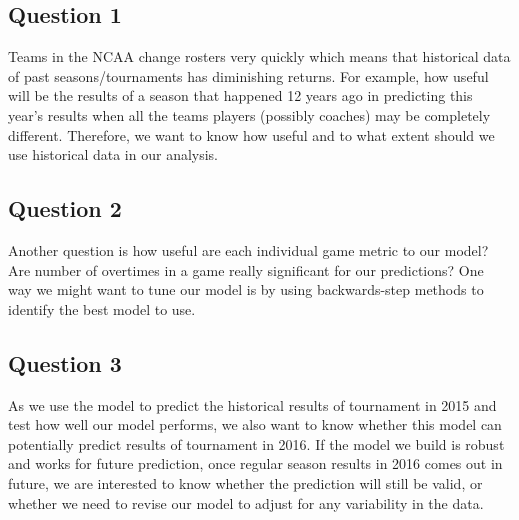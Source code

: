 \documentclass{article} %
\begin{document}
\subsection{Question 1}

Teams in the NCAA change rosters very quickly which means that historical data of past seasons/tournaments has diminishing returns. For example, how useful will be the results of a season that happened 12 years ago in predicting this year's results when all the teams players (possibly coaches) may be completely different. Therefore, we want to know how useful and to what extent should we use historical data in our analysis.


\subsection{Question 2}

Another question is how useful are each individual game metric to our model? Are number of overtimes in a game really significant for our predictions? One way we might want to tune our model is by using backwards-step methods to identify the best model to use.



\subsection{Question 3}

As we use the model to predict the historical results of tournament in 2015 and test how well our model performs, we also want to know whether this model can potentially predict results of tournament in 2016. If the model we build is robust and works for future prediction, once regular season results in 2016 comes out in future, we are interested to know whether the prediction will still be valid, or whether we need to revise our model to adjust for any variability in the data.


  
\end{document}

